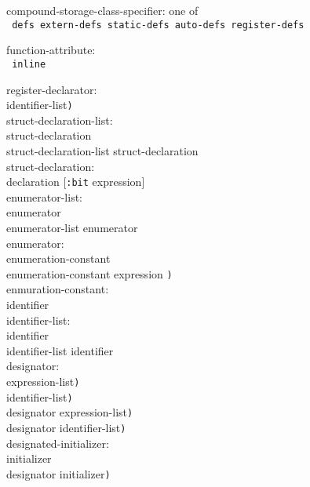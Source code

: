 \documentclass[a4j,twocolumn]{article}
\begin{document}
\noindent
compound-storage-class-specifier: {\rm one of} \\ \tt
\quad defs extern-defs static-defs auto-defs register-defs \\ \it


\noindent
function-attribute: \\ \tt
\quad inline \\ \it


\noindent
register-declarator: \\
 identifier-list{\tt )} \\

\noindent
struct-declaration-list: \\
\quad struct-declaration \\
\quad struct-declaration-list struct-declaration \\


\noindent
struct-declaration: \\
\quad declaration {\rm [}{\tt :bit} expression{\rm ]}\opt \\

\noindent
enumerator-list: \\
\quad enumerator \\
\quad enumerator-list enumerator \\


\noindent
enumerator: \\
\quad enumeration-constant \\
\quad {\tt (}enumeration-constant expression {\tt )}\\

\noindent
enmuration-constant: \\
\quad identifier \\

\noindent
identifier-list: \\
\quad identifier \\
\quad identifier-list identifier \\

\noindent
designator: \\
 expression-list{\tt )} \\
 identifier-list{\tt )} \\
 designator expression-list{\tt )} \\
 designator identifier-list{\tt )} \\

\noindent 
designated-initializer: \\
\quad initializer \\
\quad {\tt (}designator initializer{\tt )}\\
\end{document}
